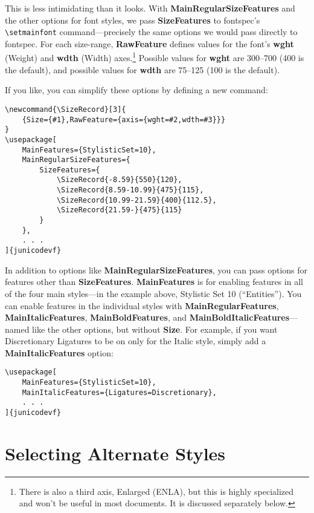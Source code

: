 \documentclass[12pt]{article}
\newcommand{\SizeRecord}[3]{{Size={#1},RawFeature={axis={wght=#2,wdth=#3}}}}
\newcommand{\fspec}{{\sffamily fontspec}}
\begin{document}
\noindent This is less intimidating than it looks. With
\textbf{MainRegularSizeFeatures} and the other options for font styles, we pass \textbf{SizeFeatures}
to \fspec’s {\verb|\setmainfont|} command---precisely the same options
we would pass directly to {\fspec}.
For each size-range, \textbf{RawFeature} defines values for the font’s \textbf{wght} (Weight)
and \textbf{wdth} (Width) axes.\footnote{There is also a third axis, Enlarged (ENLA),
but this is highly specialized and won't be useful in most documents. It is
discussed separately below.} Possible values for \textbf{wght} are
300–700 (400 is the default), and possible values for \textbf{wdth} are 75–125
(100 is the default).

If you like, you can simplify these options by defining a new command:

\footnotesize
\begin{verbatim}
\newcommand{\SizeRecord}[3]{
    {Size={#1},RawFeature={axis={wght=#2,wdth=#3}}}
}
\usepackage[
    MainFeatures={StylisticSet=10},
    MainRegularSizeFeatures={
        SizeFeatures={
            \SizeRecord{-8.59}{550}{120},
            \SizeRecord{8.59-10.99}{475}{115},
            \SizeRecord{10.99-21.59}{400}{112.5},
            \SizeRecord{21.59-}{475}{115}
        }
    },
    . . .
]{junicodevf}
\end{verbatim}
\normalsize

\noindent In addition to options like \textbf{MainRegularSizeFeatures},
you can pass options for features other than \textbf{SizeFeatures}.
\textbf{MainFeatures} is for enabling features in all of the four
main styles---in the example above, Stylistic Set 10 (“Entities”).
You can enable features in the individual styles with
\textbf{MainRegularFeatures}, \textbf{MainItalicFeatures},
\textbf{MainBoldFeatures}, and \textbf{MainBoldItalicFeatures}---named 
like the other options, but without \textbf{Size}.
For example, if you want Discretionary Ligatures to be on only for the
Italic style, simply add a \textbf{MainItalicFeatures} option:

\footnotesize
\begin{verbatim}
\usepackage[
    MainFeatures={StylisticSet=10},
    MainItalicFeatures={Ligatures=Discretionary},
    . . .
]{junicodevf}
\end{verbatim}
\normalsize

\section{Selecting Alternate Styles}
\end{document}
